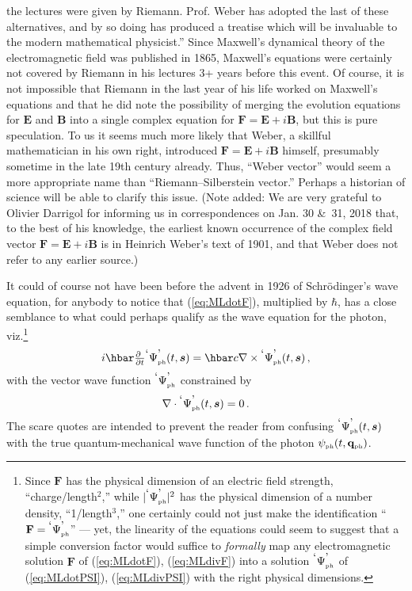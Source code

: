\documentclass[12pt]{article}
\theoremstyle{definition}
\newcommand{\pddt}{\frac{\partial\phantom{t}}{\partial t}}
\newcommand{\refeq}[1]{(\ref{#1})}
\newcommand{\vect}[1] {\boldsymbol{{ #1}} }
\newcommand{\sV}{{\vect{s}}}            %
\numberwithin{equation}{section}
\newcommand{\bB}{\mathbf{B}}
\newcommand{\bE}{\mathbf{E}}
\newcommand{\bF}{\mathbf{F}}
\newcommand{\bq}{\mathbf{q}}
\newcommand{\psiPH}{{\psi_{\mbox{\rm\tiny ph}}}}
\newcommand{\PsiPh}{{}^{\mbox{\textrm{`}}}{\Psi_{\mbox{\rm\tiny ph}}^{\mbox{\textrm{'}}}}}
\newcommand{\nab}{\nabla}
\begin{document}
{        the lectures were given by Riemann. 
      Prof. Weber has adopted the last of these alternatives, and by so doing has produced a treatise which will be invaluable to the 
        modern mathematical physicist.''
  Since Maxwell's dynamical theory of the electromagnetic field was published in 1865, Maxwell's equations 
    were certainly not covered by Riemann in his lectures 3+ years before this event. 
  Of course, it is not impossible that Riemann in the last year of his life worked on Maxwell's equations and 
    that he did note the possibility of merging the evolution equations 
    for $\bE$ and $\bB$ into a single complex equation for $\bF = \bE +i\bB$,
 but this is pure speculation.
  To us it seems much more likely that Weber, a skillful mathematician in his own right, introduced $\bF = \bE +i\bB$ himself, 
    presumably sometime in the late 19th century already.
  Thus, ``Weber vector'' would seem a more appropriate name than ``Riemann--Silberstein vector.''
  Perhaps a historian of science will be able to clarify this issue.
 (Note added: We are very grateful to Olivier Darrigol for informing us in correspondences on Jan. 30 \&\ 31, 2018 that, 
  to the best of his knowledge, the earliest known occurrence of the complex field vector $\bF = \bE +i\bB$ is in Heinrich Weber's text
 of 1901, and that Weber does not refer to any earlier source.)}

 It could of course not have been before the advent in 1926 of Schr\"odinger's wave equation, for
anybody to notice that (\ref{eq:MLdotF}), multiplied by $\hbar$, has a close semblance
to what could perhaps qualify as the wave equation for the photon, viz.\footnote{Since $\bF$ has the physical dimension 
of an electric field strength, ``charge/length$^2$,'' while $|\PsiPh|^2$ has the physical dimension of a number density, ``1/length$^3$,''
 one certainly could not just make the identification ``$\bF=\PsiPh$'' --- yet, the linearity of the equations could seem to
suggest that a simple conversion factor would suffice to \emph{formally} map any electromagnetic solution
$\bF$ of \refeq{eq:MLdotF}, \refeq{eq:MLdivF} into a solution $\PsiPh$ of \refeq{eq:MLdotPSI}, \refeq{eq:MLdivPSI}
with the right physical dimensions.\vspace{-10pt}}
\begin{equation}
 i \hbar \textstyle{\pddt}{\PsiPh}(t,\sV)
= \label{eq:MLdotPSI}
        \hbar c\nab\times{\PsiPh}(t,\sV) \, ,
\end{equation}
with the vector wave function ${\PsiPh}$ constrained by
\begin{equation}
\textstyle
        \nab\cdot {\PsiPh}(t,\sV)  
= \label{eq:MLdivPSI}
        0\, .
\end{equation}
 The scare quotes are intended to prevent the reader from confusing ${\PsiPh}(t,\sV)$ with the true quantum-mechanical wave function 
of the photon $\psiPH(t,\bq_{\mbox{\tiny{ph}}})$.
\end{document}
